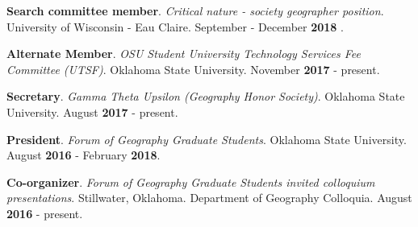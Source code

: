 \begin{cventries}
  \cventry
    {}
    {}
    {}
    {}
    {
       \begin{cvitems}
          \vspace{-3mm}
        \item {\textbf{Search committee member}. \textit{Critical nature -
              society geographer position}. University of Wisconsin - Eau
            Claire. September - December \textbf{2018} .}
          \end{cvitems}
          }

\begin{cventries}
  \cventry
    {}
    {}
    {}
    {}
    {
       \begin{cvitems}
          \vspace{-3mm}
        \item {\textbf{Alternate Member}. \textit{OSU Student University
              Technology Services Fee Committee (UTSF)}. Oklahoma State
            University. November \textbf{2017} - present.}
          \end{cvitems}
          }

  \cventry
    {}
    {}
    {}
    {}
    {
       \begin{cvitems}
          \vspace{-3mm}
        \item {\textbf{Secretary}. \textit{Gamma Theta Upsilon (Geography Honor
              Society)}. Oklahoma State University. August \textbf{2017} -
            present.}
          \end{cvitems}
          }

  \cventry
    {}
    {}
    {}
    {}
    {
       \begin{cvitems}
          \vspace{-3mm}
        \item {\textbf{President}. \textit{Forum of Geography Graduate
              Students}. Oklahoma State University. August \textbf{2016} -
            February \textbf{2018}.} 
          \end{cvitems}
          }

  \cventry
    {}
    {}
    {}
    {}
    {
       \begin{cvitems}
          \vspace{-3mm}
        \item {\textbf{Co-organizer}. \textit{Forum of Geography Graduate
              Students invited colloquium presentations}. Stillwater, Oklahoma.
            Department of Geography Colloquia. August \textbf{2016} - present.}
          \end{cvitems}
          }


\end{cventries}
\end{cventries}
